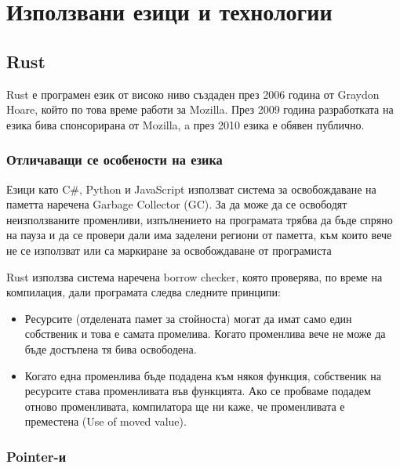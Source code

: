 \section{Използвани езици и технологии}

\subsection{Rust}
Rust е програмен език от високо ниво създаден през 2006 година от Graydon
Hoare, който по това време работи за Mozilla. През 2009 година разработката на
езика бива спонсорирана от Mozilla, a през 2010 езика е обявен публично.
\cite{Rust_Origins_Wikipedia}

\subsubsection{Отличаващи се особености на езика}

Езици като C\#, Python и JavaScript използват система за освобождаване на паметта
наречена Garbage Collector (GC). За да може да се освободят неизползваните
променливи, изпълнението на програмата трябва да бъде спряно на пауза и да се
провери дали има заделени региони от паметта, към които вече не се използват
или са маркиране за освобождаване от програмиста \cite{Garbage_Collection_Wikipedia}

Rust използва система наречена borrow checker, която проверява, по време на
компилация, дали програмата следва следните принципи:

\begin{itemize}

\item Ресурсите (отделената памет за стойноста) могат да имат само един
собственик и това е самата промелива. Когато променлива вече не може да бъде
достъпена тя бива освободена.

\item Когато една променлива бъде подадена към някоя функция, собственик на
ресурсите става променливата във функцията. Ако се пробваме подадем отново
променливата, компилатора ще ни каже, че променливата е преместена (Use of
moved value).

\end{itemize}


\subsubsection{Pointer-и}

